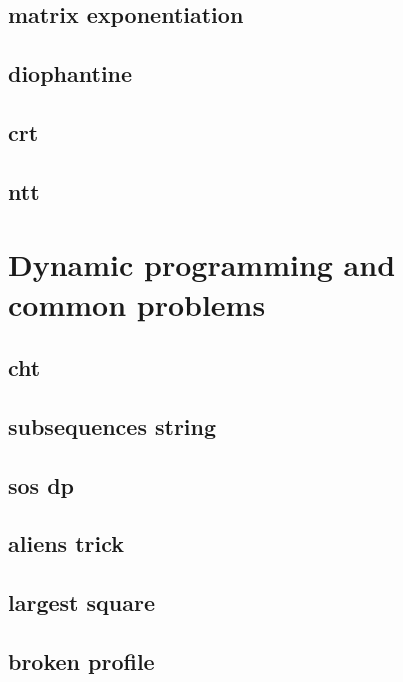\subsection{matrix exponentiation}
\raggedbottom
\hrulefill
\subsection{diophantine}
\raggedbottom
\hrulefill
\subsection{crt}
\raggedbottom
\hrulefill
\subsection{ntt}
\raggedbottom
\hrulefill

\section{Dynamic programming and common problems}
\subsection{cht}
\raggedbottom
\hrulefill
\subsection{subsequences string}
\raggedbottom
\hrulefill
\subsection{sos dp}
\raggedbottom
\hrulefill
\subsection{aliens trick}
\raggedbottom
\hrulefill
\subsection{largest square}
\raggedbottom
\hrulefill
\subsection{broken profile}
\raggedbottom
\hrulefill
